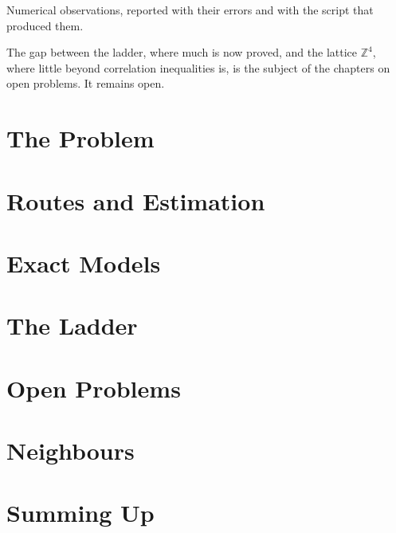 \documentclass[11pt,twoside,openany]{book}
\theoremstyle{plainsc}
\theoremstyle{defsc}
\begin{document}
Numerical observations, reported with their errors and with the script that produced them.

The gap between the ladder, where much is now proved, and the lattice $\mathbb{Z}^4$, where little beyond correlation inequalities is, is the subject of the chapters on open problems. It remains open.
\mainmatter
\part{The Problem}


\part{Routes and Estimation}




\part{Exact Models}

\part{The Ladder}




\part{Open Problems}



\part{Neighbours}

\part{Summing Up}


\appendix






\backmatter



\clearpage
{}
{}
\listoffigures
\clearpage
{}
{}
\printindex
\end{document}
